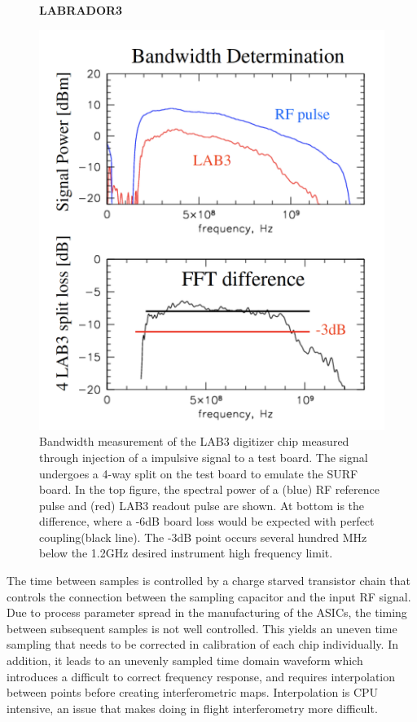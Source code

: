 \begin{figure}
\centering
    \textbf{LABRADOR3}\par\medskip
	\includegraphics[width=\textwidth]{figures/LAB3B_bandwidth}
	\caption{Bandwidth measurement of the LAB3 digitizer chip measured through injection of a impulsive signal to a test board.  The signal undergoes a 4-way split on the test board to emulate the SURF board.  In the top figure, the spectral power of a (blue) RF reference pulse and (red) LAB3 readout pulse are shown. At bottom is the difference, where a -6dB board loss would be expected with perfect coupling(black line). The -3dB point occurs several hundred MHz below the 1.2GHz desired instrument high frequency limit.\cite{LABASICPAPER}  }
	\label{fig:LAB3B_bandwidth}
\end{figure}
	
	The time between samples is controlled by a charge starved transistor chain that controls the connection between the sampling capacitor and the input RF signal.  Due to process parameter spread in the manufacturing of the ASICs, the timing between subsequent samples is not well controlled.  This yields an uneven time sampling that needs to be corrected in calibration of each chip individually.  In addition, it leads to an unevenly sampled time domain waveform which introduces a difficult to correct frequency response, and requires interpolation between points before creating interferometric maps.  Interpolation is CPU intensive, an issue that makes doing in flight interferometry more difficult.
	
